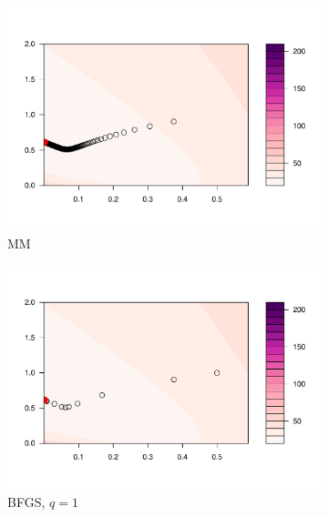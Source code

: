 \documentclass[12pt]{article}
\begin{document}
\begin{figure}
    \centering
    \begin{subfigure}[h]{0.45\textwidth}
        \centering
        \includegraphics[width = \textwidth]{plots/beta-contour_MM.pdf}
        \caption{MM}
        \label{}
    \end{subfigure}
    \begin{subfigure}[h]{0.45\textwidth}
        \centering
        \includegraphics[width = \textwidth]{plots/beta-contour_BFGS1.pdf}
        \caption{BFGS, $q=1$}
        \label{}
    \end{subfigure}\\
    \begin{subfigure}[h]{0.45\textwidth}
        \centering

\end{subfigure}
\end{figure}
\end{document}
